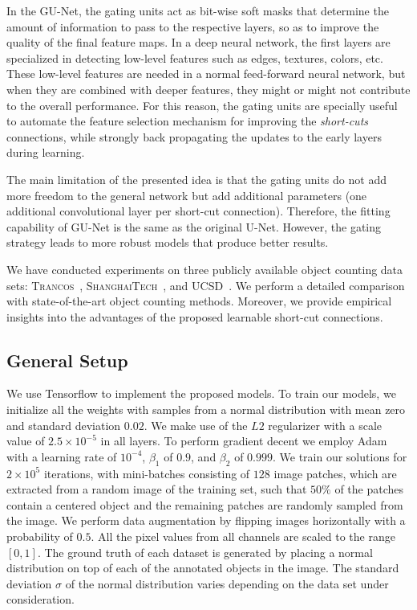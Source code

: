 \documentclass{bmvc2k}
\begin{document}
In the GU-Net, the gating units act as bit-wise soft masks that determine the amount of information to pass to the respective layers, so as to improve the quality of the final feature maps. In a deep neural network, the first layers are specialized in detecting low-level features such as edges, textures, colors, etc. These low-level features are needed in a normal feed-forward neural network, but when they are combined with deeper features, they might or might not contribute to the overall performance. For this reason, the gating units are specially useful to automate the feature selection mechanism for improving the \emph{short-cuts} connections, while strongly back propagating the updates to the early layers during learning.

The main limitation of the presented idea is that the gating units do not add more freedom to the general network but add additional parameters (one additional convolutional layer per short-cut connection). Therefore, the fitting capability of GU-Net is the same as the original U-Net. However, the gating strategy leads to more robust models that produce better results.

We have conducted experiments on three publicly available object counting data sets: \textsc{Trancos}~\cite{guerrero2015}, \textsc{ShanghaiTech}~\cite{zhang2016}, and \textsc{UCSD}~\cite{chan2008}. We perform a detailed comparison with state-of-the-art object counting methods. Moreover, we provide empirical insights into the advantages of the proposed learnable short-cut connections.

\subsection{General Setup}\label{sec:setup}

We use Tensorflow \cite{tensorflow2015} to implement the proposed models. To train our models, we initialize all the weights with samples from a normal distribution with mean zero and standard deviation $0.02$. We make use of the $L2$ regularizer with a scale value of $2.5 \times 10^{-5}$ in all layers. To perform gradient decent we employ Adam \cite{adamKingmaICLR2015} with a learning rate of $10^{-4}$, $\beta_1$ of $0.9$, and $\beta_2$ of $0.999$. We train our solutions for $2 \times 10^5$ iterations, with mini-batches consisting of $128$ image patches, which are extracted from a random image of the training set, such that $50\%$ of the patches contain a centered object and the remaining patches are randomly sampled from the image. We perform data augmentation by flipping images horizontally with a probability of $0.5$.  All the pixel values from all channels are scaled to the range $[0,1]$. The ground truth of each dataset is generated by placing a normal distribution on top of each of the annotated objects in the image. The standard deviation $\sigma$ of the normal distribution varies depending on the data set under consideration. 
\end{document}
